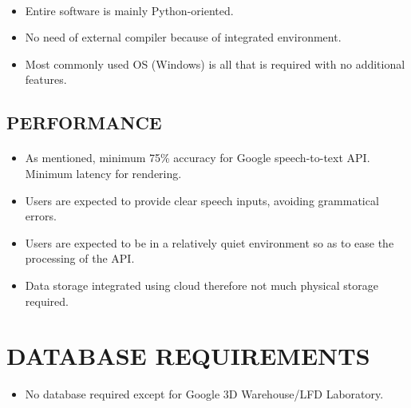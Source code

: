 \documentclass[12pt,a4paper,final,oneside]{report}
\begin{document}
\paragraph{}
\begin{itemize}
  \item Entire software is mainly Python-oriented.
  \item No need of external compiler because of integrated environment.
  \item Most commonly used OS (Windows) is all that is required with no additional features.
\end{itemize}

\subsection{PERFORMANCE}
\paragraph{}
\begin{itemize}
  \item As mentioned, minimum 75\% accuracy for Google speech-to-text API. Minimum latency for rendering.
  \item Users are expected to provide clear speech inputs, avoiding grammatical errors.
  \item Users are expected to be in a relatively quiet environment so as to ease the processing of the API.
  \item Data storage integrated using cloud therefore not much physical storage required.
\end{itemize}

\section{DATABASE  REQUIREMENTS}
\begin{itemize}
\item No database required except for Google 3D Warehouse/LFD Laboratory.
\end{itemize}
\end{document}
